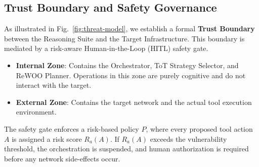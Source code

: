 \subsection{Trust Boundary and Safety Governance}
As illustrated in Fig.~\ref{fig:threat-model}, we establish a formal \textbf{Trust Boundary} between the Reasoning Suite and the Target Infrastructure. This boundary is mediated by a risk-aware Human-in-the-Loop (HITL) safety gate.
\begin{itemize}
    \item \textbf{Internal Zone}: Contains the Orchestrator, ToT Strategy Selector, and ReWOO Planner. Operations in this zone are purely cognitive and do not interact with the target.
    \item \textbf{External Zone}: Contains the target network and the actual tool execution environment.
\end{itemize}
The safety gate enforces a risk-based policy $P$, where every proposed tool action $A$ is assigned a risk score $R_a(A)$. If $R_a(A)$ exceeds the vulnerability threshold, the orchestration is suspended, and human authorization is required before any network side-effects occur.


